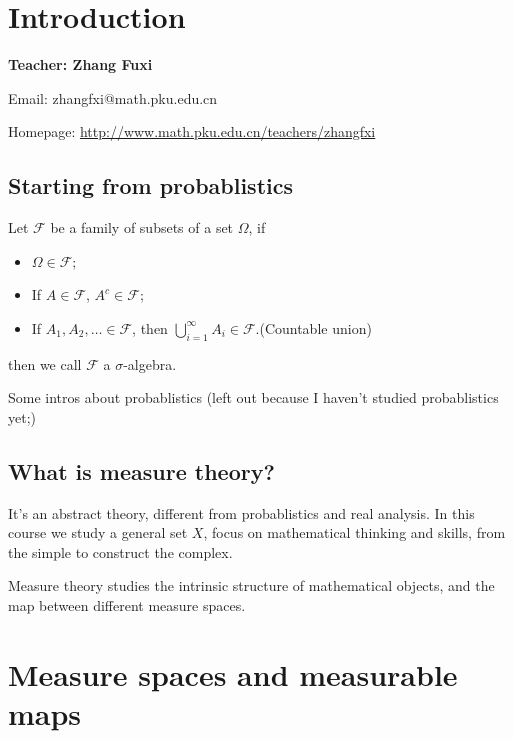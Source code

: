 \section{Introduction}
\label{sec:Introduction}
\begin{center}
	\sffamily\large\bfseries Teacher: Zhang Fuxi

	Email: zhangfxi@math.pku.edu.cn

	Homepage: \url{http://www.math.pku.edu.cn/teachers/zhangfxi}
\end{center}

\subsection{Starting from probablistics}
\label{sub:Starting from probablistics}

\begin{definition}
	Let $\mathscr{F}$ be a family of subsets of a set $\Omega$, if
	\begin{itemize}
		\item $\Omega\in \mathscr{F}$;
		\item If $A\in \mathscr{F}$, $A^c\in \mathscr{F}$;
		\item If  $ A_1,A_2,\dots\in \mathscr{F}$,
			then $\bigcup_{i=1}^\infty A_i\in \mathscr{F}$.(Countable union)
	\end{itemize}
	then we call $\mathscr{F}$ a $\sigma$-algebra.
\end{definition}

Some intros about probablistics (left out because I haven't studied
probablistics yet;)

\subsection{What is measure theory?}
\label{sub:What is measure theory?}
It's an abstract theory, different from probablistics and real analysis.
In this course we study a general set $X$,
focus on mathematical thinking and skills, from the simple
to construct the complex.

Measure theory studies the intrinsic structure of mathematical objects,
and the map between different measure spaces.

\section{Measure spaces and measurable maps}
\label{sec:Measure spaces and measurable maps}
